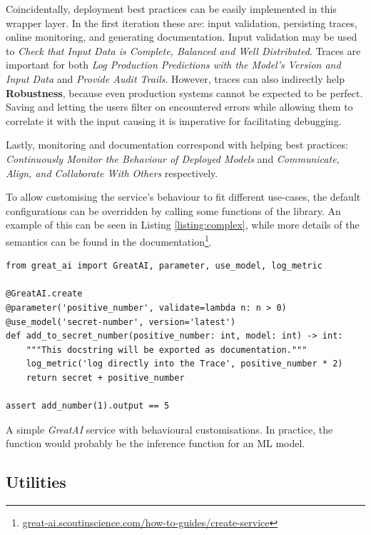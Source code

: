 Coincidentally, deployment best practices can be easily implemented in this wrapper layer. In the first iteration these are: input validation, persisting traces, online monitoring, and generating documentation. Input validation may be used to \textit{Check that Input Data is Complete, Balanced and Well Distributed}. Traces are important for both \textit{Log Production Predictions with the Model's Version and Input Data} and \textit{Provide Audit Trails}. However, traces can also indirectly help \textbf{Robustness}, because even production systems cannot be expected to be perfect. Saving and letting the users filter on encountered errors while allowing them to correlate it with the input causing it is imperative for facilitating debugging.

Lastly, monitoring and documentation correspond with helping best practices: \textit{Continuously Monitor the Behaviour of Deployed Models} and \textit{Communicate, Align, and Collaborate With Others} respectively.

To allow customising the service's behaviour to fit different use-cases, the default configurations can be overridden by calling some functions of the library. An example of this can be seen in Listing \ref{listing:complex}, while more details of the semantics can be found in the documentation\footnote{\href{https://great-ai.scoutinscience.com/how-to-guides/create-service/}{great-ai.scoutinscience.com/how-to-guides/create-service}}.

\begin{listing}[!ht]
\begin{verbatim}
from great_ai import GreatAI, parameter, use_model, log_metric

@GreatAI.create
@parameter('positive_number', validate=lambda n: n > 0)
@use_model('secret-number', version='latest')
def add_to_secret_number(positive_number: int, model: int) -> int:
    """This docstring will be exported as documentation."""
    log_metric('log directly into the Trace', positive_number * 2)
    return secret + positive_number

assert add_number(1).output == 5
\end{verbatim}
\caption{A simple \textit{GreatAI} service with behavioural customisations. In practice, the function would probably be the inference function for an ML model.}
\label{listing:complex}
\end{listing}

\subsection{Utilities}

